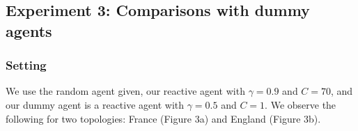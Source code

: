 \documentclass[11pt]{article}
\begin{document}
\subsection{Experiment 3: Comparisons with dummy agents}

\subsubsection{Setting}

\indent \indent We use the random agent given, our reactive agent with $\gamma=0.9$ and $C=70$, and our dummy agent is a reactive agent with $\gamma=0.5$ and $C=1$. We observe the following for two topologies: France (Figure 3a) and England (Figure 3b).
\end{document}
